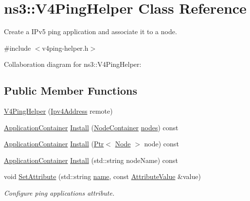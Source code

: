 \hypertarget{classns3_1_1V4PingHelper}{}\section{ns3\+:\+:V4\+Ping\+Helper Class Reference}
\label{classns3_1_1V4PingHelper}


Create a I\+Pv5 ping application and associate it to a node.  




{\ttfamily \#include $<$v4ping-\/helper.\+h$>$}



Collaboration diagram for ns3\+:\+:V4\+Ping\+Helper\+:
\subsection*{Public Member Functions}
\begin{DoxyCompactItemize}
\item 
\hyperlink{classns3_1_1V4PingHelper_ad0e02b0088effb423d2c7fc6cd637529}{V4\+Ping\+Helper} (\hyperlink{classns3_1_1Ipv4Address}{Ipv4\+Address} remote)
\item 
\hyperlink{classns3_1_1ApplicationContainer}{Application\+Container} \hyperlink{classns3_1_1V4PingHelper_acde0d28b8c6d3f5666432bc499a9bb79}{Install} (\hyperlink{classns3_1_1NodeContainer}{Node\+Container} \hyperlink{visualizer-ideas_8txt_a3e1b3808014a2c68ab0cd0182e041be2}{nodes}) const 
\item 
\hyperlink{classns3_1_1ApplicationContainer}{Application\+Container} \hyperlink{classns3_1_1V4PingHelper_a907901715f8f17ab091976938f0df1ac}{Install} (\hyperlink{classns3_1_1Ptr}{Ptr}$<$ \hyperlink{classns3_1_1Node}{Node} $>$ node) const 
\item 
\hyperlink{classns3_1_1ApplicationContainer}{Application\+Container} \hyperlink{classns3_1_1V4PingHelper_a835f52d633b2f29ede7da8cb3afcf48a}{Install} (std\+::string node\+Name) const 
\item 
void \hyperlink{classns3_1_1V4PingHelper_a834c093b4c031d64a55b3c70c6b2c464}{Set\+Attribute} (std\+::string \hyperlink{generate__test__data__lte__spectrum__model_8m_ab74e6bf80237ddc4109968cedc58c151}{name}, const \hyperlink{classns3_1_1AttributeValue}{Attribute\+Value} \&value)
\begin{DoxyCompactList}\small\item\em Configure ping applications attribute. \end{DoxyCompactList}\end{DoxyCompactItemize}
